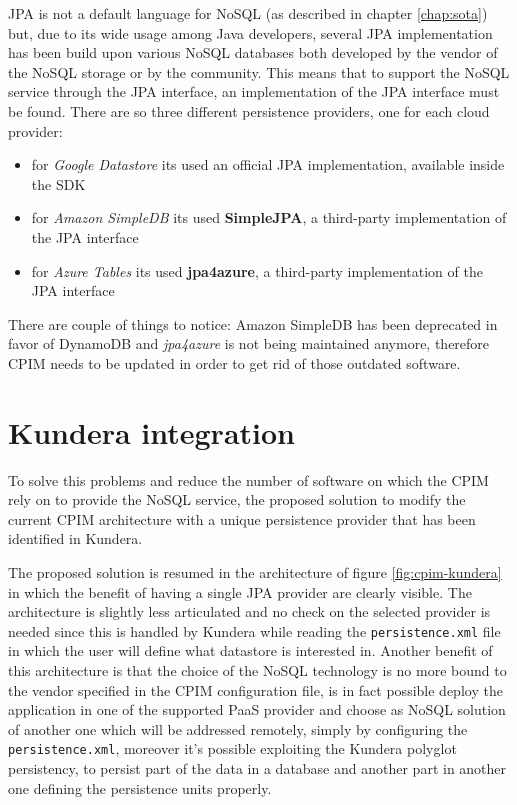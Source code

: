 \newparagraph JPA is not a default language for NoSQL (as described in chapter \ref{chap:sota}) but, due to its wide usage among Java developers, several JPA implementation has been build upon various NoSQL databases both developed by the vendor of the NoSQL storage or by the community.
This means that to support the NoSQL service through the JPA interface, an implementation of the JPA interface must be found. There are so three different persistence providers, one for each cloud provider:
\begin{itemize}
\item for \textit{Google Datastore} its used an official JPA implementation, available inside the SDK
\item for \textit{Amazon SimpleDB} its used \textbf{SimpleJPA}, a third-party implementation of the JPA interface
\item for \textit{Azure Tables} its used \textbf{jpa4azure}, a third-party implementation of the JPA interface
\end{itemize}

\noindent There are couple of things to notice: Amazon SimpleDB has been deprecated in favor of DynamoDB and \textit{jpa4azure} is not being maintained anymore, therefore CPIM needs to be updated in order to get rid of those outdated software.

\section{Kundera integration}
To solve this problems and reduce the number of software on which the CPIM rely on to provide the NoSQL service, the proposed solution  to modify the current CPIM architecture with a unique persistence provider that has been identified in Kundera.

\newparagraph The proposed solution is resumed in the architecture of figure \ref{fig:cpim-kundera} in which the benefit of having a single JPA provider are clearly visible. The architecture is slightly less articulated and no check on the selected provider is needed since this is handled by Kundera while reading the \texttt{persistence.xml} file in which the user will define what datastore is interested in.
Another benefit of this architecture is that the choice of the NoSQL technology is no more bound to the vendor specified in the CPIM configuration file, is in fact possible deploy the application in one of the supported PaaS provider and choose as NoSQL solution of another one which will be addressed remotely, simply by configuring the \texttt{persistence.xml}, moreover it's possible exploiting the Kundera polyglot persistency, to persist part of the data in a database and another part in another one defining the persistence units properly.


